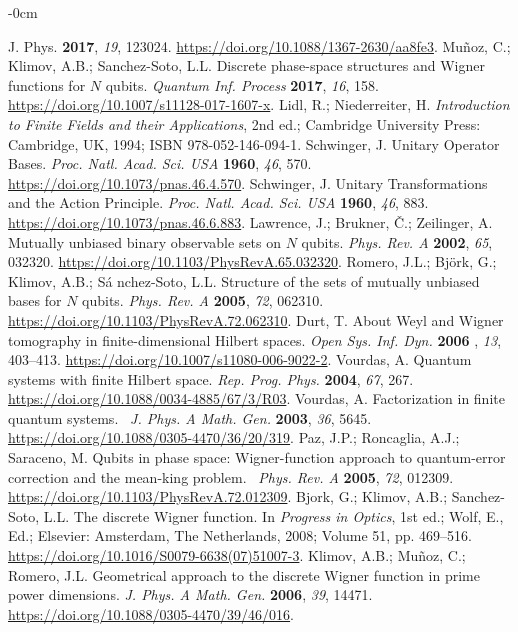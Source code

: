 \documentclass[quantumrep,article,accept,pdftex,moreauthors]{Definitions/mdpi}
\begin{document}
\begin{adjustwidth}{-\extralength}{0cm}
\begin{thebibliography}{999}
{J. Phys.} \textbf{2017}, \textit{19}, 123024. \url{https://doi.org/10.1088/1367-2630/aa8fe3}.
 Mu\~noz, C.; Klimov, A.B.; Sanchez-Soto, L.L. Discrete
phase-space structures and Wigner functions for $N$ qubits. \textit{Quantum
Inf. Process} \textbf{2017}, \textit{16}, 158. \url{https://doi.org/10.1007/s11128-017-1607-x}.
 Lidl, R.; Niederreiter, H. \textit{Introduction to Finite
Fields and their Applications}, 2nd ed.; Cambridge University Press:
Cambridge, UK, 1994; ISBN 978-052-146-094-1.
 Schwinger, J. Unitary Operator Bases. \textit{Proc.
Natl. Acad. Sci. USA} \textbf{1960}, \textit{46}, 570.
\url{https://doi.org/10.1073/pnas.46.4.570}.
 Schwinger, J. Unitary Transformations and the Action
Principle. \textit{Proc. Natl. Acad. Sci. USA} \textbf{1960}, \textit{46},
883. \url{https://doi.org/10.1073/pnas.46.6.883}.
 Lawrence, J.; Brukner, \v{C}.; Zeilinger, A. Mutually
unbiased binary observable sets on $N$ qubits. \textit{Phys. Rev. A} \textbf{2002}, \textit{65}, 032320. \url{https://doi.org/10.1103/PhysRevA.65.032320}.
 Romero, J.L.; Bj\"{o}rk, G.; Klimov, A.B.; S\'{a}%
nchez-Soto, L.L. Structure of the sets of mutually unbiased bases for $N$
qubits. \textit{Phys. Rev. A} \textbf{2005}, \textit{72}, 062310.
\url{https://doi.org/10.1103/PhysRevA.72.062310}.
 Durt, T. About Weyl and Wigner tomography in
finite-dimensional Hilbert spaces. \textit{Open Sys. Inf. Dyn.} \textbf{2006}
, \textit{13}, 403--413. \url{https://doi.org/10.1007/s11080-006-9022-2}.
 Vourdas, A. Quantum systems with finite Hilbert space. 
\textit{Rep. Prog. Phys.} \textbf{2004}, \textit{67}, 267.
\url{https://doi.org/10.1088/0034-4885/67/3/R03}.
 Vourdas, A. Factorization in finite quantum systems. 
\textit{\ J. Phys. A Math. Gen.} \textbf{2003}, \textit{36}, 5645.
\url{https://doi.org/10.1088/0305-4470/36/20/319}.
 Paz, J.P.; Roncaglia, A.J.; Saraceno, M. Qubits in phase
space: Wigner-function approach to quantum-error correction and the
mean-king problem. \textit{\ Phys. Rev. A} \textbf{2005}, \textit{72},
012309. \url{https://doi.org/10.1103/PhysRevA.72.012309}.
 Bjork, G.; Klimov, A.B.; Sanchez-Soto, L.L. The discrete
Wigner function. In \textit{Progress in Optics}, 1st ed.; Wolf, E., Ed.;
Elsevier: Amsterdam, The Netherlands, 2008; Volume 51, pp. 469--516.
\url{https://doi.org/10.1016/S0079-6638(07)51007-3}.
 Klimov, A.B.; Mu\~{n}oz, C.; Romero, J.L. Geometrical
approach to the discrete Wigner function in prime power dimensions. \textit{%
J. Phys. A Math. Gen.} \textbf{2006}, \textit{39}, 14471.
\url{https://doi.org/10.1088/0305-4470/39/46/016}.
\end{thebibliography}







\PublishersNote{}
\end{adjustwidth}
\end{document}
